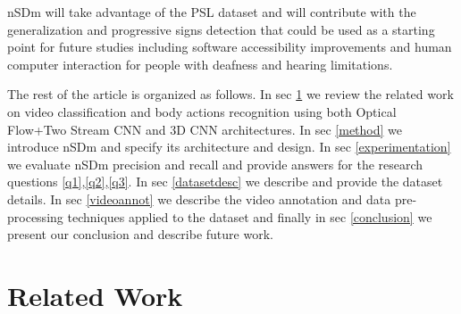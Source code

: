 \documentclass[twocolumn,conference]{article}
\begin{document}
nSDm will take advantage of the PSL dataset \cite{lsp_dataset} and will contribute with the generalization and progressive signs detection that could be used as a starting point for future studies including software accessibility improvements and human computer interaction for people with deafness and hearing limitations.

The rest of the article is organized as follows. In sec \ref{relatedwork} we review the related work on video classification and body actions recognition using both Optical Flow+Two Stream CNN and 3D CNN architectures. In sec \ref{method} we introduce nSDm and specify its architecture and design. In sec \ref{experimentation} we evaluate nSDm precision and recall and provide answers for the research questions \ref{q1},\ref{q2},\ref{q3}. In sec \ref{datasetdesc} we describe and provide the dataset details. In sec \ref{videoannot} we describe the video annotation and data pre-processing techniques applied to the dataset and finally in sec \ref{conclusion} we present our conclusion and describe future work.
\section{Related Work} \label{relatedwork}
\end{document}
